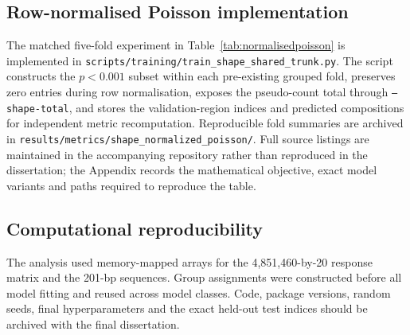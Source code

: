\documentclass[a4paper,12pt]{article}
\begin{document}
\subsection*{Row-normalised Poisson implementation}

The matched five-fold experiment in Table~\ref{tab:normalisedpoisson} is implemented in \texttt{scripts/training/train\_shape\_shared\_trunk.py}. The script constructs the $p<0.001$ subset within each pre-existing grouped fold, preserves zero entries during row normalisation, exposes the pseudo-count total through \texttt{--shape-total}, and stores the validation-region indices and predicted compositions for independent metric recomputation. Reproducible fold summaries are archived in \texttt{results/metrics/shape\_normalized\_poisson/}. Full source listings are maintained in the accompanying repository rather than reproduced in the dissertation; the Appendix records the mathematical objective, exact model variants and paths required to reproduce the table.

\subsection*{Computational reproducibility}

The analysis used memory-mapped arrays for the 4,851,460-by-20 response matrix and the 201-bp sequences. Group assignments were constructed before all model fitting and reused across model classes. Code, package versions, random seeds, final hyperparameters and the exact held-out test indices should be archived with the final dissertation.
\end{document}

